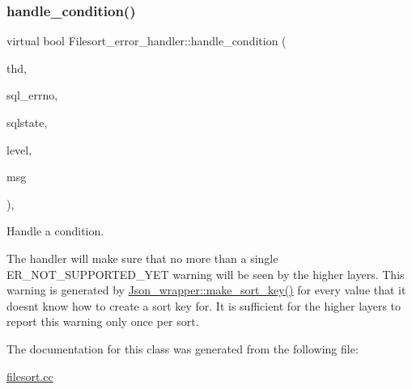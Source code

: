 \subsubsection{\texorpdfstring{handle\+\_\+condition()}{handle\_condition()}}
{\footnotesize\ttfamily virtual bool Filesort\+\_\+error\+\_\+handler\+::handle\+\_\+condition (\begin{DoxyParamCaption}\item[{T\+HD $\ast$}]{thd,  }\item[{uint}]{sql\+\_\+errno,  }\item[{const char $\ast$}]{sqlstate,  }\item[{\mbox{\hyperlink{classSql__condition_ab0602581e19cddb609bfe10c44be4e83}{Sql\+\_\+condition\+::enum\+\_\+severity\+\_\+level}} $\ast$}]{level,  }\item[{const char $\ast$}]{msg }\end{DoxyParamCaption})\hspace{0.3cm}{\ttfamily [inline]}, {\ttfamily [virtual]}}

Handle a condition.

The handler will make sure that no more than a single E\+R\+\_\+\+N\+O\+T\+\_\+\+S\+U\+P\+P\+O\+R\+T\+E\+D\+\_\+\+Y\+ET warning will be seen by the higher layers. This warning is generated by \mbox{\hyperlink{classJson__wrapper_a7ccea914b374ff03975dda48cefe16de}{Json\+\_\+wrapper\+::make\+\_\+sort\+\_\+key()}} for every value that it doesn\textquotesingle{}t know how to create a sort key for. It is sufficient for the higher layers to report this warning only once per sort. 

The documentation for this class was generated from the following file\+:\begin{DoxyCompactItemize}
\item 
\mbox{\hyperlink{filesort_8cc}{filesort.\+cc}}\end{DoxyCompactItemize}
